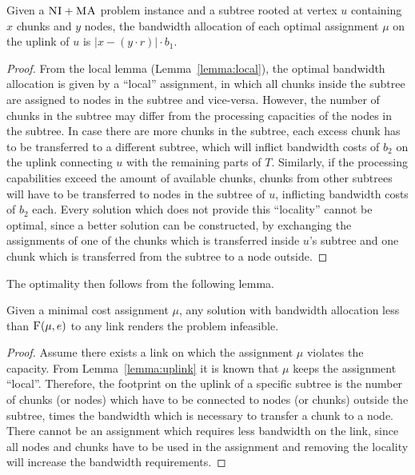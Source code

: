 \documentclass[9pt,twocolumn]{scrartcl}
\newcommand{\Problem}{\textsc{DummyName Problem}}
\newcommand{\maciek}[1]{\textcolor{brown}{maciek: #1}}
\newcommand{\MaFactor}{r}
\newcommand{\VmChunkAssignment}{\mu}
\newcommand{\SubstrateEdge}{\ensuremath{e}}
\newcommand{\CC}{\textsc{NI}}
\newcommand{\MA}{\textsc{MA}}
\newcommand{\Cost}{\textsc{F}}
\newcommand{\Tree}{\ensuremath{T}}
\newcommand{\CostTrans}{\ensuremath{b_1}}
\newcommand{\CostCom}{\ensuremath{b_2}}
\newcommand{\Sol}{\ensuremath{SOL}}
\begin{document}
\begin{lemma}
Given a $\CC+\MA$ problem instance and a subtree rooted at vertex $u$ containing $x$
chunks and $y$ nodes, the bandwidth allocation of each optimal assignment
$\VmChunkAssignment$ on the uplink of $u$ is $|x-(y\cdot\MaFactor)|\cdot
\CostTrans$.
\label{lemma:uplink}
\end{lemma}
\begin{proof}
From the local lemma (Lemma~\ref{lemma:local}), 
the optimal bandwidth allocation is given by 
a ``local'' assignment, in which all chunks inside the
subtree are assigned to nodes in the subtree and vice-versa. However, the
number of chunks in the subtree may differ from the processing capacities of
the nodes in the subtree. In case there are more chunks in the subtree, each
excess chunk has to be transferred to a different subtree, which will
inflict bandwidth costs of $\CostCom$ on the uplink connecting $u$ with the
remaining parts of $\Tree$. Similarly, if the processing capabilities exceed the amount of
available chunks, chunks from other subtrees will have to be transferred to
nodes in the subtree of $u$, inflicting bandwidth costs of $\CostCom$ each. 
Every solution
which does not provide this ``locality'' cannot be optimal, since a better
solution can be constructed, by exchanging the assignments of one of the chunks
which is transferred inside $u$'s subtree and one chunk which is transferred from
the subtree to a node outside.
\end{proof}

The optimality then follows from the following lemma.
\begin{lemma}
Given a minimal cost assignment $\VmChunkAssignment$, 
any solution with bandwidth allocation less
than $\Cost(\VmChunkAssignment,
\SubstrateEdge)$ to any link renders the problem
infeasible.
\label{lemma:no_bandwidth}
\end{lemma}
\begin{proof}
Assume there exists a link on which the assignment $\VmChunkAssignment$
violates the capacity. From Lemma~\ref{lemma:uplink} it is
known that $\VmChunkAssignment$ keeps the assignment ``local''. 
Therefore, the footprint on the uplink of a specific subtree is the number of chunks
(or nodes) which have to be connected to nodes (or chunks) outside the subtree,
times the bandwidth which is necessary to transfer a chunk to a node. There
cannot be an assignment which requires less bandwidth on the link, since all nodes
and chunks have to be used in the assignment and removing the
locality will increase the bandwidth requirements.
\end{proof}
%
%
\end{document}
